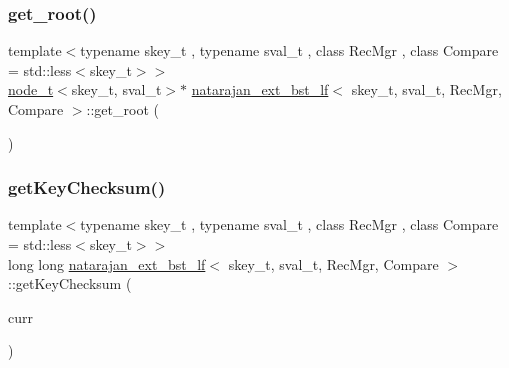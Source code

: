 \mbox{\label{classnatarajan__ext__bst__lf_aa6b371791b726b19343e1a6c64d38f92}} 
\subsubsection{\texorpdfstring{get\+\_\+root()}{get\_root()}\hspace{0.1cm}{\footnotesize\ttfamily [2/2]}}
{\footnotesize\ttfamily template$<$typename skey\+\_\+t , typename sval\+\_\+t , class Rec\+Mgr , class Compare  = std\+::less$<$skey\+\_\+t$>$$>$ \\
\hyperlink{structnode__t}{node\+\_\+t}$<$skey\+\_\+t, sval\+\_\+t$>$$\ast$ \hyperlink{classnatarajan__ext__bst__lf}{natarajan\+\_\+ext\+\_\+bst\+\_\+lf}$<$ skey\+\_\+t, sval\+\_\+t, Rec\+Mgr, Compare $>$\+::get\+\_\+root (\begin{DoxyParamCaption}{ }\end{DoxyParamCaption})\hspace{0.3cm}{\ttfamily [inline]}}

\mbox{\label{classnatarajan__ext__bst__lf_a33ed925f7c23b46bf67a688d78e1714a}} 
\subsubsection{\texorpdfstring{get\+Key\+Checksum()}{getKeyChecksum()}\hspace{0.1cm}{\footnotesize\ttfamily [1/4]}}
{\footnotesize\ttfamily template$<$typename skey\+\_\+t , typename sval\+\_\+t , class Rec\+Mgr , class Compare  = std\+::less$<$skey\+\_\+t$>$$>$ \\
long long \hyperlink{classnatarajan__ext__bst__lf}{natarajan\+\_\+ext\+\_\+bst\+\_\+lf}$<$ skey\+\_\+t, sval\+\_\+t, Rec\+Mgr, Compare $>$\+::get\+Key\+Checksum (\begin{DoxyParamCaption}\item[{\hyperlink{structnode__t}{node\+\_\+t}$<$ skey\+\_\+t, sval\+\_\+t $>$ $\ast$}]{curr }\end{DoxyParamCaption})\hspace{0.3cm}{\ttfamily [inline]}}

